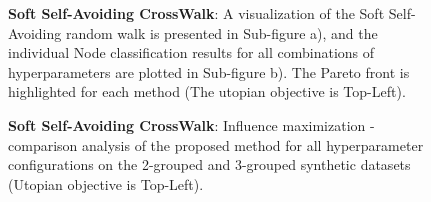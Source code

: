 

\begin{figure}[h]
    \centering
    \qquad
    \caption{\textbf{Soft Self-Avoiding CrossWalk}: A visualization of the Soft Self-Avoiding random walk is presented in Sub-figure a), and the individual Node classification results for all combinations of hyperparameters are plotted in Sub-figure b). The Pareto front is highlighted for each method (The utopian objective is Top-Left). }
    \label{fig:ssa-visualisations}
\end{figure}

\begin{figure}[h]
    \centering
    \hfill
    \caption{\textbf{Soft Self-Avoiding CrossWalk}: Influence maximization - comparison analysis of the proposed method for all hyperparameter configurations on the 2-grouped and 3-grouped synthetic datasets (Utopian objective is Top-Left).}
    \label{fig:ssa-visualisations-infmax}
\end{figure}


